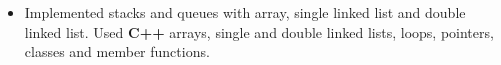 \documentclass[10pt,a4paper,sans]{moderncv} %
\begin{document}


\begin{itemize}
\item{Implemented stacks and queues with array, single linked list and double linked list. Used \textbf{C++} arrays, single and double linked lists, loops, pointers, classes and  member functions.}
\end{itemize}



\end{document}
